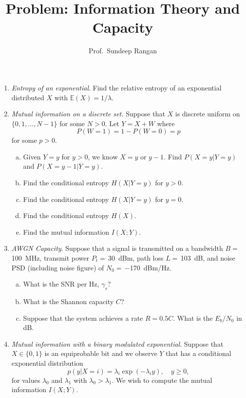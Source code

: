 \documentclass[11pt]{article}
\def\Exp{\mathbb{E}}
\begin{document}
\title{Problem:  Information Theory and Capacity}
\author{Prof.\ Sundeep Rangan}
\date{}

\maketitle

\begin{enumerate}

\item \label{prob:exp} \emph{Entropy of an exponential}.  Find the relative entropy of an exponential distributed $X$
with $\Exp(X)=1/\lambda$.


\item \emph{Mutual information on a discrete set.}  Suppose that $X$ is discrete uniform on $\{0,1,\ldots,N-1\}$ 
for some $N > 0$.  Let $Y = X + W$ where 
\[
    P(W=1)=1-P(W=0) = p
\]
for some $p > 0$.
\begin{enumerate}[(a)] 
\item Given $Y = y$ for $y>0$, we know $X=y$ or $y-1$.  Find $P(X=y|Y=y)$ and $P(X=y-1|Y=y)$.

\item Find the conditional entropy $H(X|Y=y)$ for $y > 0$.

\item Find the conditional entropy $H(X|Y=y)$ for $y = 0$.

\item Find the conditional entropy $H(X)$.

\item Find the mutual information $I(X;Y)$.
\end{enumerate}


\item \label{prob:capacity}  \emph{AWGN Capacity}.
Suppose that a signal is transmitted on a bandwidth $B=$\, \SI{100}{MHz},
transmit power $P_t=$\,\SI{30}{dBm}, path loss $L=$\,\SI{103}{dB},
and noise PSD (including noise figure) of $N_0=$\,\SI{-170}{dBm/Hz}.
\begin{enumerate}[(a)]
\item What is the SNR per Hz, $\gamma_s$?

\item What is the Shannon capacity $C$?

\item Suppose that the system achieves a rate $R = 0.5C$.  What is the $E_b/N_0$ in dB.
\end{enumerate}


\item \label{prob:expmi} \emph{Mutual information with a binary modulated exponential}.  
Suppose that $X \in \{0,1\}$
is an equiprobable bit and we observe $Y$ that has a conditional exponential distribution
\[
    p(y|X=i) = \lambda_i \exp(-\lambda_i y), \quad y \geq 0,
\]
for values $\lambda_0$ and $\lambda_1$ with $\lambda_0 > \lambda_1$.  We wish to compute the mutual information $I(X;Y)$.  



\end{enumerate}
\end{document}

